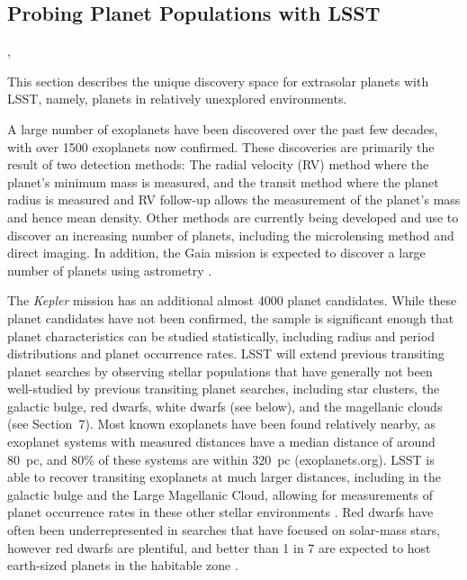 %
%

\subsection{Probing Planet Populations with LSST}
\def\secname{planets}\label{sec:\secname}

,

This section describes the unique discovery space for
extrasolar planets with LSST, namely,
planets in relatively unexplored environments.


A large number of exoplanets have been discovered over the past few
decades, with over 1500 exoplanets now confirmed. These discoveries are
primarily the result of two detection methods: The radial velocity (RV)
method where the planet's minimum mass is measured, and the transit
method where the planet radius is measured and RV follow-up allows the
measurement of the planet's mass and hence mean density. Other methods
are currently being developed and use to discover an increasing number of
planets, including the microlensing method and direct imaging. In
addition, the Gaia mission is expected to discover a large number of
planets using astrometry \citep{2014exha.book.....P}.

The {\it Kepler} mission has an additional almost 4000 planet
candidates. While these planet candidates have not been confirmed, the
sample is significant enough that planet characteristics can be studied
statistically, including radius and period distributions and planet
occurrence rates. LSST will extend previous transiting planet searches
by observing stellar populations that have generally not been
well-studied by previous transiting planet searches, including star
clusters, the galactic bulge, red dwarfs, white dwarfs (see below), and
the magellanic clouds (see Section~7). Most known exoplanets have been
found relatively nearby, as exoplanet systems with measured distances
have a median distance of around 80~pc, and 80\% of these systems are
within 320~pc (exoplanets.org). LSST is able to recover transiting
exoplanets at much larger distances, including in the galactic bulge and
the Large Magellanic Cloud, allowing for measurements of planet
occurrence rates in these other stellar 
environments \citep{2015AJ....149...16L,2015AJ....150...34J}.
Red dwarfs have often been
underrepresented in searches that have focused on solar-mass stars, however red
dwarfs are plentiful, and better than 1 in 7 are expected to host earth-sized
planets in the habitable zone \citep{2015ApJ...807...45D}.

